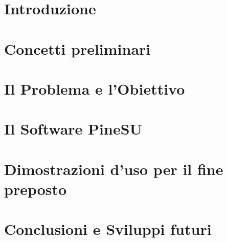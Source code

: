 \documentclass[12pt,a4paper]{report}
\begin{document}

 
\chapter{Introduzione}



\chapter{Concetti preliminari}



\chapter{Il Problema e l’Obiettivo}



\chapter{Il Software PineSU}



\chapter{Dimostrazioni d’uso per il fine preposto}



\chapter{Conclusioni e Sviluppi futuri}







\cleardoublepage{} %
\end{document}
